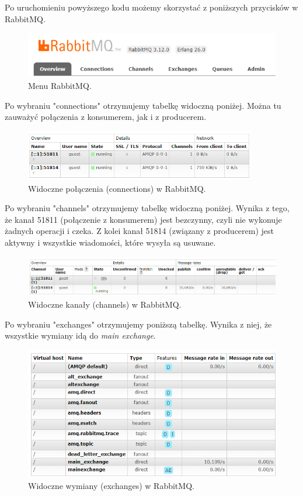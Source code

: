 \documentclass[12pt,twoside]{article}
\begin{document}
\clearpage

Po uruchomieniu powyższego kodu możemy skorzystać z poniższych przycisków w RabbitMQ.
\begin{figure}[!htb]
	\centering
	\includegraphics[width=1\textwidth]{figures/fig21}
	\caption{Menu RabbitMQ.}
	\label{fig:zdjecie}
\end{figure}

Po wybraniu "connections" otrzymujemy tabelkę widoczną poniżej. Można tu zauważyć połączenia z konsumerem, jak i z producerem.
\begin{figure}[!htb]
	\centering
	\includegraphics[width=0.9\textwidth]{figures/fig16}
	\caption{Widoczne połączenia (connections) w RabbitMQ.}
	\label{fig:zdjecie}
\end{figure}


Po wybraniu "channels" otrzymujemy tabelkę widoczną poniżej. Wynika z tego, że kanał 51811 (połączenie z konsumerem) jest bezczynny, czyli nie wykonuje żadnych operacji i czeka. Z kolei kanał 51814 (związany z producerem) jest aktywny i wszystkie wiadomości, które wysyła są usuwane.
\begin{figure}[!htb]
	\centering
	\includegraphics[width=1\textwidth]{figures/fig17}
	\caption{Widoczne kanały (channels) w RabbitMQ.}
	\label{fig:zdjecie}
\end{figure}
\clearpage

Po wybraniu "exchanges" otrzymujemy poniższą tabelkę. Wynika z niej, że wszystkie wymiany idą do \textit{main exchange}.
\begin{figure}[!htb]
	\centering
	\includegraphics[width=1\textwidth]{figures/fig18}
	\caption{Widoczne wymiany (exchanges) w  RabbitMQ.}
	\label{fig:zdjecie}
\end{figure}
\end{document}
